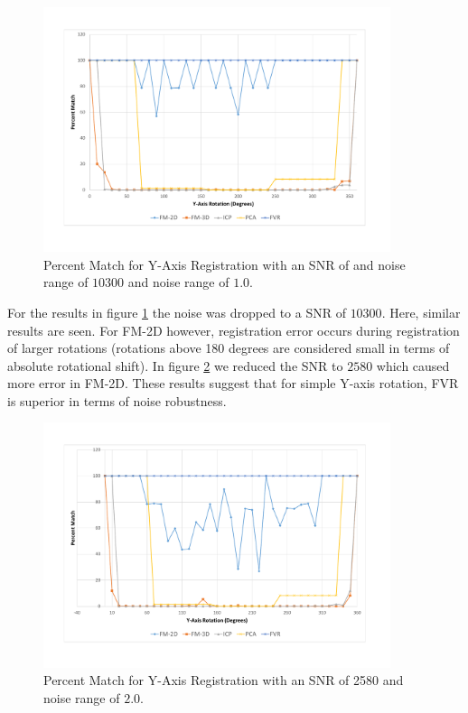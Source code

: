 \begin{figure}[!htb]
\centering
\includegraphics[width=4.0in]{images/results/noise/YRNoise1}
\caption{Percent Match for Y-Axis Registration with an SNR of and noise range of $10300$ and noise range of $1.0$.}
\label{fig:YRNoise1}
\end{figure}

For the results in figure \ref{fig:YRNoise1} the noise was dropped to a SNR of $10300$. Here, similar results are seen. For FM-2D however, registration error occurs during registration of larger rotations (rotations above 180 degrees are considered small in terms of absolute rotational shift). In figure \ref{fig:YRNoise2} we reduced the SNR to $2580$ which caused more error in FM-2D. These results suggest that for simple Y-axis rotation, FVR is superior in terms of noise robustness.  \\

\begin{figure}[!htb]
\centering
\includegraphics[width=4.0in]{images/results/noise/YRNoise2}
\caption{Percent Match for Y-Axis Registration with an SNR of 2580 and noise range of $2.0$.}
\label{fig:YRNoise2}
\end{figure}

